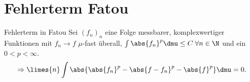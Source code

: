 \section*{Fehlerterm Fatou}

\begin{karte}{Fehlerterm in Fatou}
    Sei \( (f_n)_n \) eine Folge messbarer, komplexwertiger 
    Funktionen mit \( f_n \rightarrow f \) \(\mu\)-fast überall, 
    \( \int \abs{f_n}^p \dmu \leq C \;\forall n\in\N \) und 
    ein \( 0 < p < \infty \). 
    \[ \Rightarrow \limes{n} \int \abs{ \abs{f_n}^p - \abs{f - f_n}^p - \abs{f}^p } \dmu = 0. \]
\end{karte}